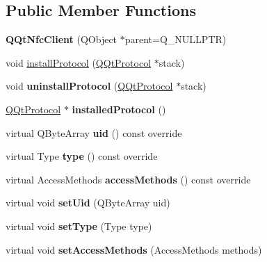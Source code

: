 \subsection*{Public Member Functions}
\begin{DoxyCompactItemize}
\item 
\mbox{\label{class_q_qt_nfc_client_acc67f89320ae2bb08c53bd1598604f3e}} 
{\bfseries Q\+Qt\+Nfc\+Client} (Q\+Object $\ast$parent=Q\+\_\+\+N\+U\+L\+L\+P\+TR)
\item 
void \mbox{\hyperlink{class_q_qt_nfc_client_aa6ac0c535ce6014b43e3291c4316e605}{install\+Protocol}} (\mbox{\hyperlink{class_q_qt_protocol}{Q\+Qt\+Protocol}} $\ast$stack)
\item 
\mbox{\label{class_q_qt_nfc_client_ad4cd4351d05fbe8bc686c7627a781ec0}} 
void {\bfseries uninstall\+Protocol} (\mbox{\hyperlink{class_q_qt_protocol}{Q\+Qt\+Protocol}} $\ast$stack)
\item 
\mbox{\label{class_q_qt_nfc_client_a48976d2d4521e7dfca8f1346d629e85a}} 
\mbox{\hyperlink{class_q_qt_protocol}{Q\+Qt\+Protocol}} $\ast$ {\bfseries installed\+Protocol} ()
\item 
\mbox{\label{class_q_qt_nfc_client_a42e78f73bbb6e312aa8dafbcceb7553d}} 
virtual Q\+Byte\+Array {\bfseries uid} () const override
\item 
\mbox{\label{class_q_qt_nfc_client_a64e7385348035db384718c7ceb8e2ab4}} 
virtual Type {\bfseries type} () const override
\item 
\mbox{\label{class_q_qt_nfc_client_a763e006405a3b98b354f4c27343efa2b}} 
virtual Access\+Methods {\bfseries access\+Methods} () const override
\item 
\mbox{\label{class_q_qt_nfc_client_a8ab7e686f6a1da0b74d42585c7ac2b1a}} 
virtual void {\bfseries set\+Uid} (Q\+Byte\+Array uid)
\item 
\mbox{\label{class_q_qt_nfc_client_ac450771d14ff1b5eaad7ae3aa98e45be}} 
virtual void {\bfseries set\+Type} (Type type)
\item 
\mbox{\label{class_q_qt_nfc_client_a0d384c532a0c8cbd55156a9079b6a354}} 
virtual void {\bfseries set\+Access\+Methods} (Access\+Methods methods)
\end{DoxyCompactItemize}

